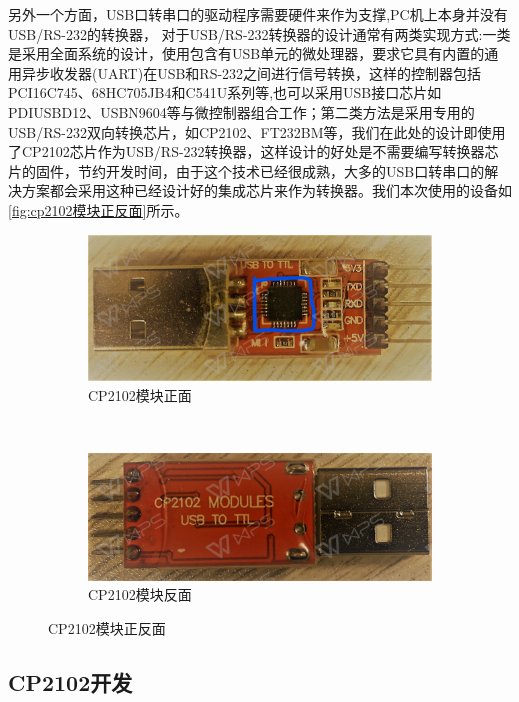 	另外一个方面，USB口转串口的驱动程序需要硬件来作为支撑,PC机上本身并没有USB/RS-232的转换器，
	对于USB/RS-232转换器的设计通常有两类实现方式:一类是采用全面系统的设计，使用包含有USB单元的微处理器，要求它具有内置的通用异步收发器(UART)在USB和RS-232之间进行信号转换，这样的控制器包括PCI16C745、68HC705JB4和C541U系列等\cite{USB与RS232接口转换器的设计},也可以采用USB接口芯片如PDIUSBD12、USBN9604等与微控制器组合工作；第二类方法是采用专用的USB/RS-232双向转换芯片，如CP2102、FT232BM等，我们在此处的设计即使用了CP2102芯片作为USB/RS-232转换器，这样设计的好处是不需要编写转换器芯片的固件，节约开发时间，由于这个技术已经很成熟，大多的USB口转串口的解决方案都会采用这种已经设计好的集成芯片来作为转换器。我们本次使用的设备如\autoref{fig:cp2102模块正反面}所示。
\begin{figure}[h]
\centering
  \begin{subfigure}[b]{0.4\textwidth}
  \includegraphics[width=\textwidth]{./graphics/cp2102Front.pdf}
  \caption{CP2102模块正面}\label{fig:cp2102Front}
  \end{subfigure}
  ~
  \begin{subfigure}[b]{0.4\textwidth}
  \includegraphics[width=\textwidth]{./graphics/cp2102Rear.pdf}
  \caption{CP2102模块反面}\label{fig:cp2102Rear}
  \end{subfigure}
\caption{CP2102模块正反面}\label{fig:cp2102模块正反面}
\end{figure}




\subsection{CP2102开发}
	
